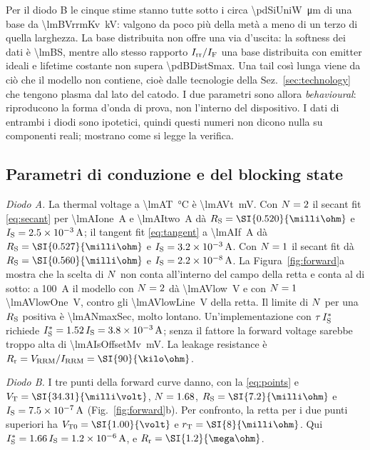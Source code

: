 \documentclass[10pt,a4paper]{scrartcl}
\let\newcommand\pdvaluedefine
\newcommand{\IF}{I_\mathrm{F}}
\newcommand{\Irr}{I_\mathrm{rr}}
\newcommand{\IS}{I_\mathrm{S}}
\newcommand{\RS}{R_\mathrm{S}}
\newcommand{\Rr}{R_\mathrm{r}}
\newcommand{\VT}{V_\mathrm{T}}
\newcommand{\VTo}{V_\mathrm{T0}}
\newcommand{\rT}{r_\mathrm{T}}
\newcommand{\Vrrm}{V_\mathrm{RRM}}
\newcommand{\Irrm}{I_\mathrm{RRM}}
\newcommand{\Nem}{N}                          %
\begin{document}
Per il diodo B le cinque stime stanno tutte sotto i circa \SI{\pdSiUniW}{\micro\metre} di una base da \SI{\lmBVrrmKv}{\kilo\volt}: valgono da poco più della metà a meno di un terzo di quella larghezza. La base distribuita non offre una via d'uscita: la softness dei dati è \num{\lmBS}, mentre allo stesso rapporto $\Irr/\IF$ una base distribuita con emitter ideali e lifetime costante non supera \num{\pdBDistSmax}. Una tail così lunga viene da ciò che il modello non contiene, cioè dalle tecnologie della Sez.~\ref{sec:technology} che tengono plasma dal lato del catodo. I due parametri sono allora \emph{behavioural}: riproducono la forma d'onda di prova, non l'interno del dispositivo. I dati di entrambi i diodi sono ipotetici, quindi questi numeri non dicono nulla su componenti reali; mostrano come si legge la verifica.

\subsection{Parametri di conduzione e del blocking state}
\emph{Diodo A.} La thermal voltage a \SI{\lmAT}{\celsius} è \SI{\lmAVt}{\milli\volt}. Con $\Nem = \lmAN$ il secant fit \eqref{eq:secant} per \SI{\lmAIone}{\ampere} e \SI{\lmAItwo}{\ampere} dà $\RS = \SI{\lmARsSecTwo}{\milli\ohm}$ e $\IS = \lmAIsSecTwo\,\mathrm{A}$; il tangent fit \eqref{eq:tangent} a \SI{\lmAIf}{\ampere} dà $\RS = \SI{\lmARsTanTwo}{\milli\ohm}$ e $\IS = \lmAIsTanTwo\,\mathrm{A}$. Con $\Nem = 1$ il secant fit dà $\RS = \SI{\lmARsSecOne}{\milli\ohm}$ e $\IS = \lmAIsSecOne\,\mathrm{A}$. La Figura~\ref{fig:forward}a mostra che la scelta di $\Nem$ non conta all'interno del campo della retta e conta al di sotto: a \SI{100}{\ampere} il modello con $\Nem = 2$ dà \SI{\lmAVlow}{\volt} e con $\Nem = 1$ \SI{\lmAVlowOne}{\volt}, contro gli \SI{\lmAVlowLine}{\volt} della retta. Il limite di $\Nem$ per una $\RS$ positiva è \num{\lmANmaxSec}, molto lontano. Un'implementazione con $\tau\,\IS^{*}$ richiede $\IS^{*} = \lmAIsFactor\,\IS = \lmAIsStar\,\mathrm{A}$; senza il fattore la forward voltage sarebbe troppo alta di \SI{\lmAIsOffsetMv}{\milli\volt}. La leakage resistance è $\Rr = \Vrrm/\Irrm = \SI{\lmARr}{\kilo\ohm}$.

\emph{Diodo B.} I tre punti della forward curve danno, con la \eqref{eq:points} e $\VT = \SI{\lmBVt}{\milli\volt}$, $\Nem = \lmBN$, $\RS = \SI{\lmBRs}{\milli\ohm}$ e $\IS = \lmBIs\,\mathrm{A}$ (Fig.~\ref{fig:forward}b). Per confronto, la retta per i due punti superiori ha $\VTo = \SI{\lmBVto}{\volt}$ e $\rT = \SI{\lmBRt}{\milli\ohm}$. Qui $\IS^{*} = \lmBIsFactor\,\IS = \lmBIsStar\,\mathrm{A}$, e $\Rr = \SI{\lmBRr}{\mega\ohm}$.
\end{document}
